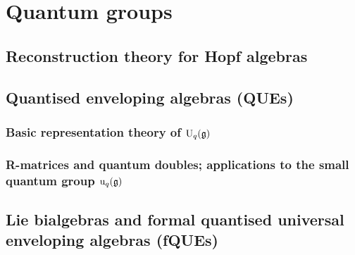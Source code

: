 \section{Quantum groups}
    \subsection{Reconstruction theory for Hopf algebras}
    
    \subsection{Quantised enveloping algebras (QUEs)}
        \subsubsection{Basic representation theory of \texorpdfstring{$\mathrm{U}_q(\mathfrak{g})$}{}}
        
        \subsubsection{R-matrices and quantum doubles; applications to the small quantum group \texorpdfstring{$\mathrm{u}_q(\mathfrak{g})$}{}}
    
    \subsection{Lie bialgebras and formal quantised universal enveloping algebras (fQUEs)}